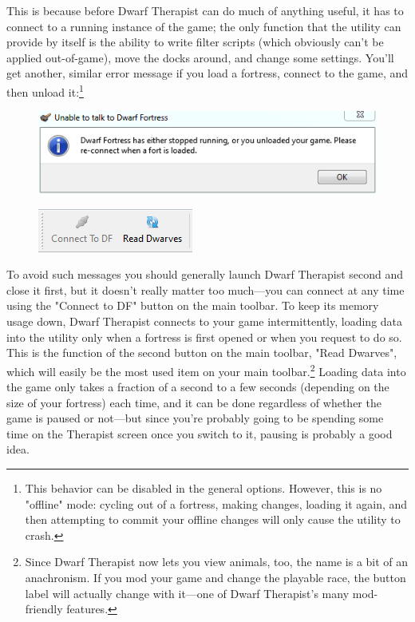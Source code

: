 \documentclass[]{article}
\begin{document}
This is because before Dwarf Therapist can do much of anything useful, it has to connect to a running
instance of the game; the only function that the utility can provide by itself is the ability to write
filter scripts (which obviously can't be applied out-of-game), move the docks around, and change some
settings. You'll get another, similar error message if you load a fortress, connect to the game, and then
unload it:\footnote{This behavior can be disabled in the general options. However, this is no "offline"
mode: cycling out of a fortress, making changes, loading it again, and then attempting to commit your
offline changes will only cause the utility to crash.}

\vfill \begin{figure}[h!] \centering
\includegraphics{Sec1Fig2}
\end{figure}
\vfill

\begin{figure}
\vspace{-20pt}
  \begin{center}
    \includegraphics[scale=.95]{Sec1Fig3}
  \end{center}
  \vspace{-10pt}
  \end{figure}
To avoid such messages you should generally launch Dwarf Therapist second and close it first, but it
doesn't really matter too much---you can connect at any time using the "Connect to DF" button on the
main toolbar. To keep its memory usage down, Dwarf Therapist connects to your game intermittently, loading
data into the utility only when a fortress is first opened or when you request to do so. This is the
function of the second button on the main toolbar, "Read Dwarves", which will easily be the most used
item on your main toolbar.\footnote{Since Dwarf Therapist now lets you view animals, too, the name is a
bit of an anachronism. If you mod your game and change the playable race, the button label will actually
change with it---one of Dwarf Therapist's many mod-friendly features.} Loading data into the game only
takes a fraction of a second to a few seconds (depending on the size of your fortress) each time, and it
can be done regardless of whether the game is paused or not---but since you're probably going to be
spending some time on the Therapist screen once you switch to it, pausing is probably a good idea.
\newpage
\end{document}
